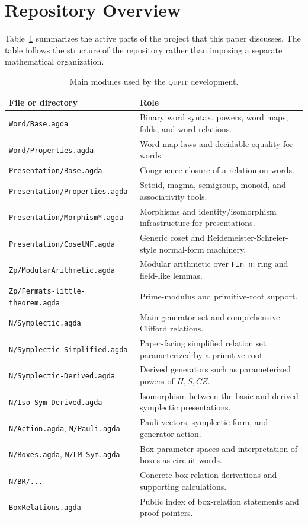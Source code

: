 \documentclass[sigplan,screen,review,anonymous]{acmart}
\newcommand{\Qupit}{\textsc{qupit}\xspace}
\newcommand{\file}[1]{\texttt{#1}}
\begin{document}
\section{Repository Overview}

Table~\ref{tab:modules} summarizes the active parts of the project
that this paper discusses.  The table follows the structure of the
repository rather than imposing a separate mathematical organization.

\begin{table}
\centering
\caption{Main modules used by the \Qupit development.}
\label{tab:modules}
\begin{tabular}{ll}
\toprule
File or directory & Role \\
\midrule
\file{Word/Base.agda} & Binary word syntax, powers, word maps, folds, and word relations. \\
\file{Word/Properties.agda} & Word-map laws and decidable equality for words. \\
\file{Presentation/Base.agda} & Congruence closure of a relation on words. \\
\file{Presentation/Properties.agda} & Setoid, magma, semigroup, monoid, and associativity tools. \\
\file{Presentation/Morphism*.agda} & Morphisms and identity/isomorphism infrastructure for presentations. \\
\file{Presentation/CosetNF.agda} & Generic coset and Reidemeister-Schreier-style normal-form machinery. \\
\file{Zp/ModularArithmetic.agda} & Modular arithmetic over \texttt{Fin n}; ring and field-like lemmas. \\
\file{Zp/Fermats-little-theorem.agda} & Prime-modulus and primitive-root support. \\
\file{N/Symplectic.agda} & Main generator set and comprehensive Clifford relations. \\
\file{N/Symplectic-Simplified.agda} & Paper-facing simplified relation set parameterized by a primitive root. \\
\file{N/Symplectic-Derived.agda} & Derived generators such as parameterized powers of \(H,S,CZ\). \\
\file{N/Iso-Sym-Derived.agda} & Isomorphism between the basic and derived symplectic presentations. \\
\file{N/Action.agda}, \file{N/Pauli.agda} & Pauli vectors, symplectic form, and generator action. \\
\file{N/Boxes.agda}, \file{N/LM-Sym.agda} & Box parameter spaces and interpretation of boxes as circuit words. \\
\file{N/BR/...} & Concrete box-relation derivations and supporting calculations. \\
\file{BoxRelations.agda} & Public index of box-relation statements and proof pointers. \\
\bottomrule
\end{tabular}
\end{table}
\end{document}
